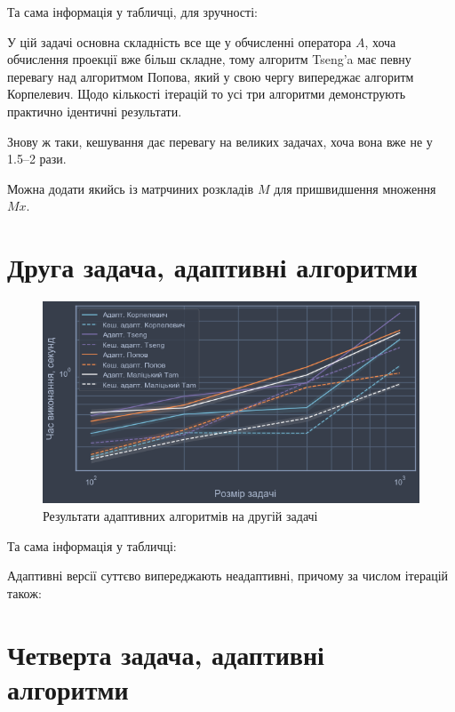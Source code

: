 Та сама інформація у табличці, для зручності:



У цій задачі основна складність все ще у обчисленні оператора $A$, %
хоча обчислення проекції вже більш складне, %
тому алгоритм Tseng'a має певну перевагу над алгоритмом Попова, який у свою чергу випереджає алгоритм Корпелевич. Щодо кількості ітерацій то усі три алгоритми демонструють практично ідентичні результати.



Знову ж таки, кешування дає перевагу на великих задачах, хоча вона вже не у 1.5--2 рази.

\begin{remark}
    Можна додати якийсь із матрчиних розкладів $M$ для пришвидшення множення $M x$. 
\end{remark}

\section{Друга задача, адаптивні алгоритми}

\begin{figure}[H]
    \centering
    \includegraphics[width=\textwidth]{img/2/adapt/time.png}
    \caption{Результати адаптивних алгоритмів на другій задачі}
\end{figure}

Та сама інформація у табличці:



Адаптивні версії суттєво випереджають неадаптивні, причому за числом ітерацій також:



\section{Четверта задача, адаптивні алгоритми}

